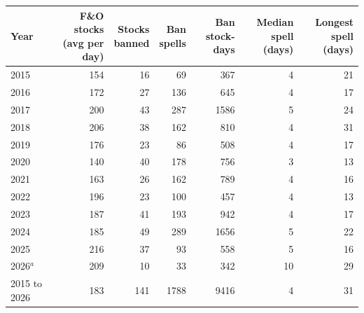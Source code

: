 \begin{tabular}{lrrrrrr}
\toprule
Year & \shortstack[r]{F\&O stocks\\(avg per day)} & \shortstack[r]{Stocks\\banned} & \shortstack[r]{Ban\\spells} & \shortstack[r]{Ban\\stock-days} & \shortstack[r]{Median spell\\(days)} & \shortstack[r]{Longest spell\\(days)} \\
\midrule
2015 & 154 & 16 & 69 & 367 & 4 & 21 \\
2016 & 172 & 27 & 136 & 645 & 4 & 17 \\
2017 & 200 & 43 & 287 & 1586 & 5 & 24 \\
2018 & 206 & 38 & 162 & 810 & 4 & 31 \\
2019 & 176 & 23 & 86 & 508 & 4 & 17 \\
2020 & 140 & 40 & 178 & 756 & 3 & 13 \\
2021 & 163 & 26 & 162 & 789 & 4 & 16 \\
2022 & 196 & 23 & 100 & 457 & 4 & 13 \\
2023 & 187 & 41 & 193 & 942 & 4 & 17 \\
2024 & 185 & 49 & 289 & 1656 & 5 & 22 \\
2025 & 216 & 37 & 93 & 558 & 5 & 16 \\
2026$^{a}$ & 209 & 10 & 33 & 342 & 10 & 29 \\
\midrule
2015 to 2026 & 183 & 141 & 1788 & 9416 & 4 & 31 \\
\bottomrule
\end{tabular}
